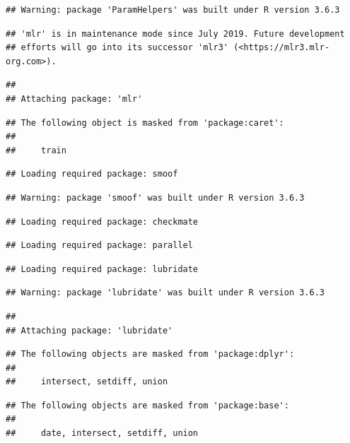 \documentclass[
]{article}
\begin{document}
\begin{verbatim}
## Warning: package 'ParamHelpers' was built under R version 3.6.3
\end{verbatim}

\begin{verbatim}
## 'mlr' is in maintenance mode since July 2019. Future development
## efforts will go into its successor 'mlr3' (<https://mlr3.mlr-org.com>).
\end{verbatim}

\begin{verbatim}
## 
## Attaching package: 'mlr'
\end{verbatim}

\begin{verbatim}
## The following object is masked from 'package:caret':
## 
##     train
\end{verbatim}

\begin{verbatim}
## Loading required package: smoof
\end{verbatim}

\begin{verbatim}
## Warning: package 'smoof' was built under R version 3.6.3
\end{verbatim}

\begin{verbatim}
## Loading required package: checkmate
\end{verbatim}

\begin{verbatim}
## Loading required package: parallel
\end{verbatim}

\begin{verbatim}
## Loading required package: lubridate
\end{verbatim}

\begin{verbatim}
## Warning: package 'lubridate' was built under R version 3.6.3
\end{verbatim}

\begin{verbatim}
## 
## Attaching package: 'lubridate'
\end{verbatim}

\begin{verbatim}
## The following objects are masked from 'package:dplyr':
## 
##     intersect, setdiff, union
\end{verbatim}

\begin{verbatim}
## The following objects are masked from 'package:base':
## 
##     date, intersect, setdiff, union
\end{verbatim}
\end{document}
